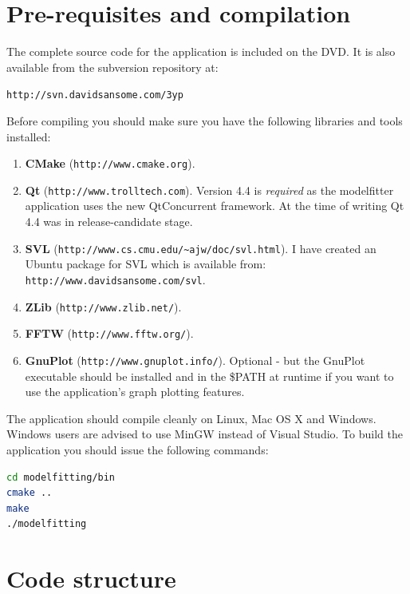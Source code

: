 \section{Pre-requisites and compilation}
\label{devdocs}

The complete source code for the application is included on the DVD.
It is also available from the subversion repository at:

\texttt{http://svn.davidsansome.com/3yp}

\bigskip
\noindent Before compiling you should make sure you have the following libraries and tools installed:

\begin{enumerate}
	\item \textbf{CMake} (\texttt{http://www.cmake.org}).
	\item \textbf{Qt} (\texttt{http://www.trolltech.com}).
		Version 4.4 is \emph{required} as the modelfitter application uses the new QtConcurrent framework.
		At the time of writing Qt 4.4 was in release-candidate stage.
	\item \textbf{SVL} (\verb+http://www.cs.cmu.edu/~ajw/doc/svl.html+).
		I have created an Ubuntu package for SVL which is available from: \\
		\texttt{http://www.davidsansome.com/svl}.
	\item \textbf{ZLib} (\texttt{http://www.zlib.net/}).
	\item \textbf{FFTW} (\texttt{http://www.fftw.org/}).
	\item \textbf{GnuPlot} (\texttt{http://www.gnuplot.info/}).
		Optional - but the GnuPlot executable should be installed and in the \$PATH at runtime if you want to use the application's graph plotting features.
\end{enumerate}

The application should compile cleanly on Linux, Mac OS X and Windows.
Windows users are advised to use MinGW instead of Visual Studio.
To build the application you should issue the following commands:

\begin{lstlisting}[firstnumber=1,language=sh,frame=single,morekeywords={cmake,make}]
cd modelfitting/bin
cmake ..
make
./modelfitting
\end{lstlisting}

\section{Code structure}

